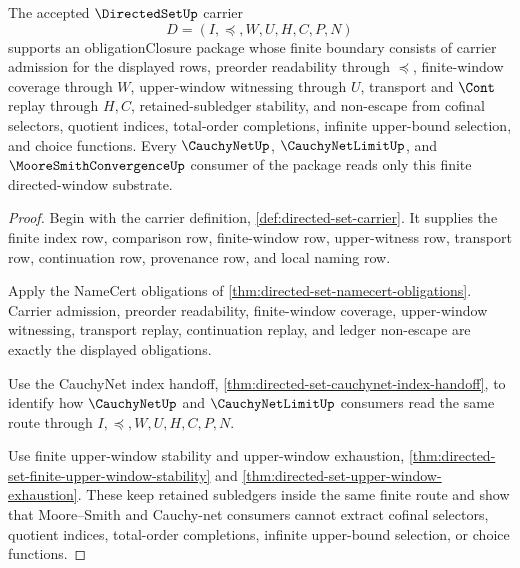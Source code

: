 \begin{theorem}
\label{thm:directed-set-obligation-closure-package}
The accepted $\DirectedSetUp$ carrier
$$
D=(I,\preceq,W,U,H,C,P,N)
$$
supports an obligationClosure package whose finite boundary consists of carrier admission for the displayed rows, preorder readability through $\preceq$, finite-window coverage through $W$, upper-window witnessing through $U$, transport and $\Cont$ replay through $H,C$, retained-subledger stability, and non-escape from cofinal selectors, quotient indices, total-order completions, infinite upper-bound selection, and choice functions. Every $\CauchyNetUp$, $\CauchyNetLimitUp$, and $\MooreSmithConvergenceUp$ consumer of the package reads only this finite directed-window substrate.
\end{theorem}
\begin{proof}
Begin with the carrier definition, \autoref{def:directed-set-carrier}. It supplies the finite index row, comparison row, finite-window row, upper-witness row, transport row, continuation row, provenance row, and local naming row.

Apply the NameCert obligations of \autoref{thm:directed-set-namecert-obligations}. Carrier admission, preorder readability, finite-window coverage, upper-window witnessing, transport replay, continuation replay, and ledger non-escape are exactly the displayed obligations.

Use the CauchyNet index handoff, \autoref{thm:directed-set-cauchynet-index-handoff}, to identify how $\CauchyNetUp$ and $\CauchyNetLimitUp$ consumers read the same route through $I,\preceq,W,U,H,C,P,N$.

Use finite upper-window stability and upper-window exhaustion, \autoref{thm:directed-set-finite-upper-window-stability} and \autoref{thm:directed-set-upper-window-exhaustion}. These keep retained subledgers inside the same finite route and show that Moore--Smith and Cauchy-net consumers cannot extract cofinal selectors, quotient indices, total-order completions, infinite upper-bound selection, or choice functions.
\end{proof}

